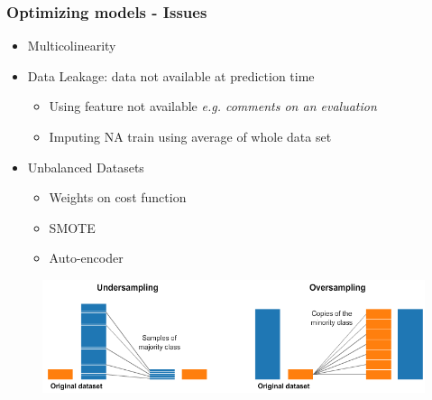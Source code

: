 \begin{frame}\frametitle{Optimizing models - Issues}
   \begin{itemize}
      \item Multicolinearity
      \item Data Leakage: data not available at prediction time
      \begin{itemize}
         \item Using feature not available \textit{e.g. comments on an evaluation}
         \item Imputing NA train using average of whole data set
      \end{itemize}
      \item Unbalanced Datasets
      \begin{itemize}
         \item Weights on cost function
         \item SMOTE
         \item Auto-encoder
      \end{itemize}
   \end{itemize}
   \begin{figure}[H]
      \includegraphics[scale=.32]{../images/illustrations/model_unbalanced_dataset.png}
   \end{figure}
\end{frame}


